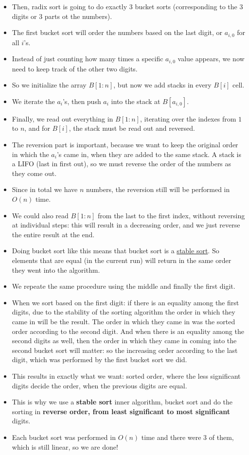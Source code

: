 \begin{itemize}
    \item Then, radix sort is going to do exactly $3$ bucket sorts (corresponding to the $3$ digits or $3$ parts ot the numbers).
    \item The first bucket sort will order the numbers based on the last digit, or $a_{i,0}$ for all $i$'s.
    \item Instead of just counting how many times a specific $a_{i,0}$ value appears, we now need to keep track of the other two digits.
    \item So we initialize the array $B[1:n]$, but now we add stacks in every $B[i]$ cell.
    \item We iterate the $a_i$'s, then push $a_i$ into the stack at $B[a_{i,0}]$.
    \item Finally, we read out everything in $B[1:n]$, iterating over the indexes from $1$ to $n$, and for $B[i]$, the stack must be read out and reversed.
    \item The reversion part is important, because we want to keep the original order in which the $a_i$'s came in, when they are added to the same stack. A stack is a LIFO (last in first out), so we must reverse the order of the numbers as they come out.
    \item Since in total we have $n$ numbers, the reversion still will be performed in $O(n)$ time.
    \item We could also read $B[1:n]$ from the last to the first index, without reversing at individual steps: this will result in a decreasing order, and we just reverse the entire result at the end.
    \item Doing bucket sort like this means that bucket sort is a \href{https://en.wikipedia.org/wiki/Sorting_algorithm#Stability}{stable sort}. So elements that are equal (in the current run) will return in the same order they went into the algorithm.
    \item We repeate the same procedure using the middle and finally the first digit.
    \item When we sort based on the first digit: if there is an equality among the first digits, due to the stability of the sorting algorithm the order in which they came in will be the result. The order in which they came in was the sorted order according to the second digit. And when there is an equality among the second digits as well, then the order in which they came in coming into the second bucket sort will matter: so the increasing order according to the last digit, which was performed by the first bucket sort we did.
    \item This results in exactly what we want: sorted order, where the less significant digits decide the order, when the previous digits are equal.
    \item This is why we use a \textbf{stable sort} inner algorithm, bucket sort and do the sorting in \textbf{reverse order, from least significant to most significant} digits.
    \item Each bucket sort was performed in $O(n)$ time and there were $3$ of them, which is still linear, so we are done!
\end{itemize}
